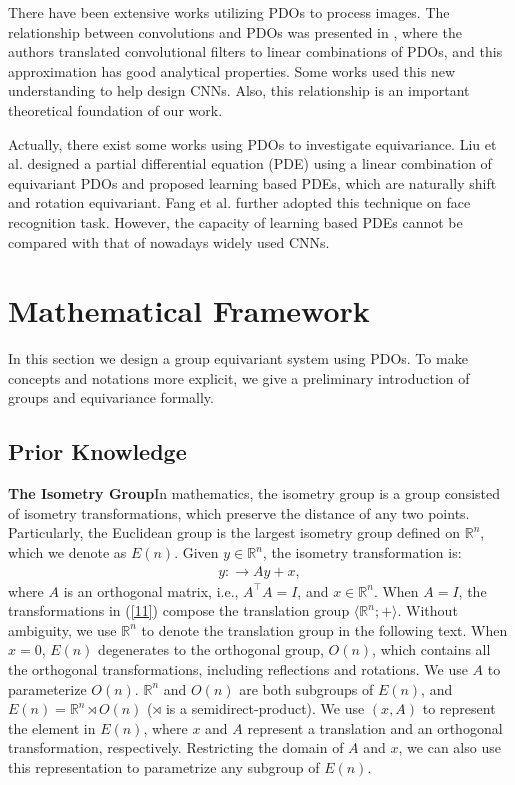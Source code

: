\documentclass{article}
\begin{document}
There have been extensive works \cite{jain1978partial,witkin1987scale-space,koenderink1984the,perona1990scale-space,osher1990feature-oriented} utilizing PDOs to process images. The relationship between convolutions and PDOs was presented in \cite{dong2017image,ruthotto2018deep}, where the authors translated convolutional filters to linear combinations of PDOs, and this approximation has good analytical properties. Some works \cite{long2018pde,long2019pde} used this new understanding to help design CNNs. Also, this relationship is an important theoretical foundation of our work.

Actually, there exist some works using PDOs to investigate equivariance. Liu et al.  designed a partial differential equation (PDE) using a linear combination of equivariant PDOs and proposed learning based PDEs, which are naturally shift and rotation equivariant. Fang et al.  further adopted this technique on face recognition task. However, the capacity of learning based PDEs cannot be compared with that of nowadays widely used CNNs.


\section{Mathematical Framework}
In this section we design a group equivariant system using PDOs. To make concepts and notations more explicit, we give a preliminary introduction of groups and equivariance formally. 

\subsection{Prior Knowledge}
\textbf{The Isometry Group}\quad In mathematics, the isometry group is a group consisted of isometry transformations, which preserve the distance of any two points. Particularly, the Euclidean group is the largest isometry group defined on $\mathbb{R}^n$, which we denote as $E(n)$. Given $y\in \mathbb{R}^n$, the isometry transformation is:
\begin{align}
y:\to Ay+x,
\label{11}
\end{align}
where $A$ is an orthogonal matrix, i.e., $A^{\top}A=I$, and $x \in\mathbb{R}^n$. When $A=I$, the transformations in (\ref{11}) compose the translation group $\langle \mathbb{R}^n;+\rangle$. Without ambiguity, we use $\mathbb{R}^n$ to denote the translation group in the following text. When $x=0$, $E(n)$ degenerates to the orthogonal group, $O(n)$, which contains all the orthogonal transformations, including reflections and rotations. We use $A$ to parameterize $O(n)$. $\mathbb{R}^n$ and $O(n)$ are both subgroups of $E(n)$, 
and $E(n)=\mathbb{R}^n \rtimes O(n)$  ($\rtimes$ is a semidirect-product). We use $(x,A)$ to represent the element in $E(n)$, where $x$ and $A$ represent a translation and an orthogonal transformation, respectively. Restricting the domain of $A$ and $x$, we can also use this representation to parametrize any subgroup of $E(n)$. 
\end{document}
